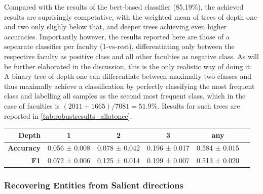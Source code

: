 Compared with the results of the \gls{bert}-based classifier (85.19\%), the achieved results are suprisingly competative, with the weighted mean of trees of depth one and two only slighly below that, and deeper trees achieving even higher accuracies. 
Importantly however, the results reported here are those of a sepearate classifier per faculty (1-vs-rest), differentiating only between the respective faculty as positive class and all other faculties as negative class. As will be further elaborated in the discussion, this is the only realistic way of doing it: A binary tree of depth one can differentiate between maximally two classes and thus maximally achieve a classification by perfectly classifying the most frequent class and labelling all samples as the second most frequent class, which in the case of faculties is $(2011+1665)/7081=51.9\%$. Results for such trees are reported in \autoref{tab:robustresults_allatonce}.

\begin{table}[H]
	\begin{tabular}{rccccc}
		\toprule
		\textbf{Depth} &  \textbf{1} & \textbf{2} & \textbf{3} & \textbf{any} \\
		\midrule
		\textbf{Accuracy} & 0.056 ± 0.008 & 0.078 ± 0.042 & 0.196 ± 0.017 & 0.584 ± 0.015 \\
		\textbf{F1}       & 0.072 ± 0.006 & 0.125 ± 0.014 & 0.199 ± 0.007 & 0.513 ± 0.020 \\
		\bottomrule
	\end{tabular}
	\label{tab:robustresults_allatonce}
\end{table}


\subsubsection{Recovering Entities from Salient directions}

